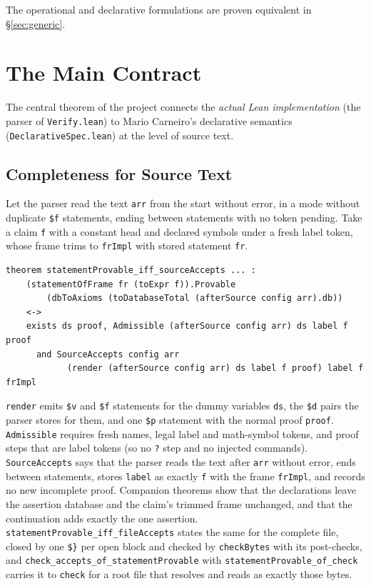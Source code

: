 \documentclass[11pt]{article}
\newcommand{\lean}[1]{\lstinline[language=Lean4]{#1}}
\newcommand{\file}[1]{\texttt{#1}}
\begin{document}
The operational and declarative formulations are proven equivalent in
\S\ref{sec:generic}.

\section{The Main Contract}
\label{sec:contract}

The central theorem of the project connects the \emph{actual Lean
implementation} (the parser of \file{Verify.lean}) to Mario Carneiro's
declarative semantics (\file{DeclarativeSpec.lean}) at the level of
source text.

\subsection{Completeness for Source Text}

Let the parser read the text \lean{arr} from the start without error, in a
mode without duplicate \verb|$f| statements, ending between statements
with no token pending.  Take a claim \lean{f} with a constant head and
declared symbols under a fresh label token, whose frame trims to
\lean{frImpl} with stored statement \lean{fr}.

\begin{lstlisting}[caption={Completeness for source text (\file{SourceCompleteness.lean}).},label=lst:source]
theorem statementProvable_iff_sourceAccepts ... :
    (statementOfFrame fr (toExpr f)).Provable
        (dbToAxioms (toDatabaseTotal (afterSource config arr).db))
    <->
    exists ds proof, Admissible (afterSource config arr) ds label f proof
      and SourceAccepts config arr
            (render (afterSource config arr) ds label f proof) label f frImpl
\end{lstlisting}

\lean{render} emits \verb|$v| and \verb|$f| statements for the dummy
variables \lean{ds}, the \verb|$d| pairs the parser stores for them, and
one \verb|$p| statement with the normal proof \lean{proof}.
\lean{Admissible} requires fresh names, legal label and math-symbol
tokens, and proof steps that are label tokens (so no \verb|?| step and no
injected commands).  \lean{SourceAccepts} says that the parser reads the
text after \lean{arr} without error, ends between statements, stores
\lean{label} as exactly \lean{f} with the frame \lean{frImpl}, and records
no new incomplete proof.  Companion theorems show that the declarations
leave the assertion database and the claim's trimmed frame unchanged, and
that the continuation adds exactly the one assertion.
\lean{statementProvable_iff_fileAccepts} states the same for the complete
file, closed by one \verb|$}| per open block and checked by
\lean{checkBytes} with its post-checks, and
\lean{check_accepts_of_statementProvable} with \lean{statementProvable_of_check}
carries it to \lean{check} for a root file that resolves and reads as
exactly those bytes.
\end{document}
